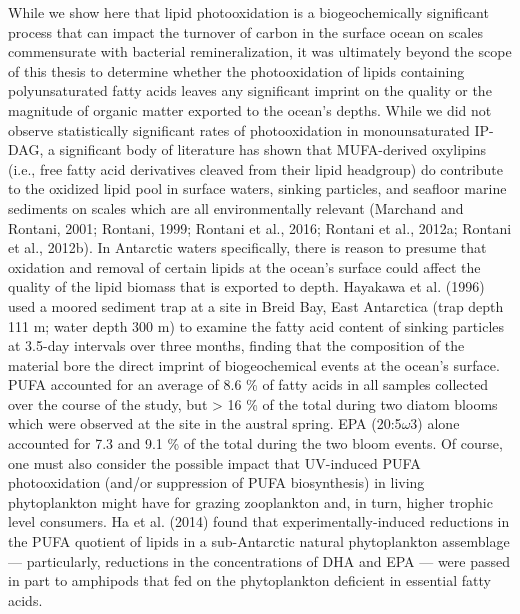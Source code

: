 While we show here that lipid photooxidation is a biogeochemically significant process that can impact the turnover of carbon in the surface ocean on scales commensurate with bacterial remineralization, it was ultimately beyond the scope of this thesis to determine whether the photooxidation of lipids containing polyunsaturated fatty acids leaves any significant imprint on the quality or the magnitude of organic matter exported to the ocean's depths. While we did not observe statistically significant rates of photooxidation in monounsaturated IP-DAG, a significant body of literature has shown that MUFA-derived oxylipins (i.e., free fatty acid derivatives cleaved from their lipid headgroup) do contribute to the oxidized lipid pool in surface waters, sinking particles, and seafloor marine sediments on scales which are all environmentally relevant (Marchand and Rontani, 2001; Rontani, 1999; Rontani et al., 2016; Rontani et al., 2012a; Rontani et al., 2012b). In Antarctic waters specifically, there is reason to presume that oxidation and removal of certain lipids at the ocean's surface could affect the quality of the lipid biomass that is exported to depth. Hayakawa et al. (1996) used a moored sediment trap at a site in Breid Bay, East Antarctica (trap depth 111 m; water depth 300 m) to examine the fatty acid content of sinking particles at 3.5-day intervals over three months, finding that the composition of the material bore the direct imprint of biogeochemical events at the ocean's surface. PUFA accounted for an average of 8.6 \% of fatty acids in all samples collected over the course of the study, but \textgreater{} 16 \% of the total during two diatom blooms which were observed at the site in the austral spring. EPA (20:5$\omega$3) alone accounted for 7.3 and 9.1 \% of the total during the two bloom events. Of course, one must also consider the possible impact that UV-induced PUFA photooxidation (and/or suppression of PUFA biosynthesis) in living phytoplankton might have for grazing zooplankton and, in turn, higher trophic level consumers. Ha et al. (2014) found that experimentally-induced reductions in the PUFA quotient of lipids in a sub-Antarctic natural phytoplankton assemblage --- particularly, reductions in the concentrations of DHA and EPA --- were passed in part to amphipods that fed on the phytoplankton deficient in essential fatty acids.


